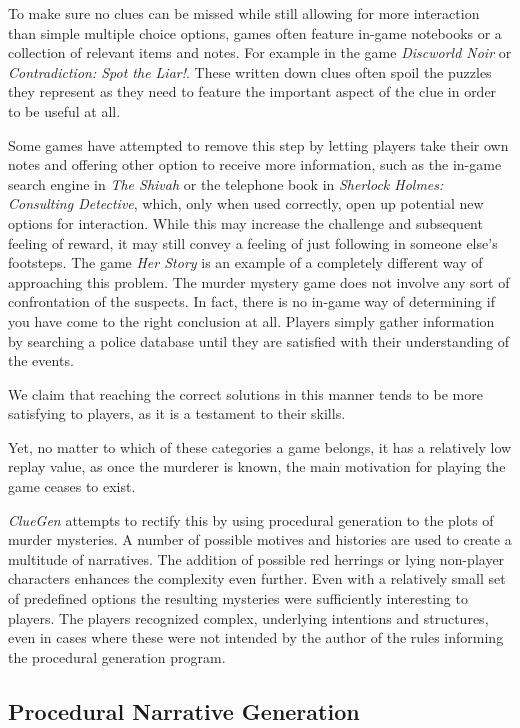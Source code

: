 To make sure no clues can be missed while still allowing for more interaction than simple multiple choice options, games often feature in-game notebooks or a collection of relevant items and notes.
For example in the game \emph{Discworld Noir} or \emph{Contradiction: Spot the Liar!}.
These written down clues often spoil the puzzles they represent as they need to feature the important aspect of the clue in order to be useful at all.

Some games have attempted to remove this step by letting players take their own notes and offering other option to receive more information, such as the in-game search engine in \emph{The Shivah} or the telephone book in \emph{Sherlock Holmes: Consulting Detective}, which, only when used correctly, open up potential new options for interaction.
While this may increase the challenge and subsequent feeling of reward, it may still convey a feeling of just following in someone else's footsteps.
The game \emph{Her Story} is an example of a completely different way of approaching this problem.
The murder mystery game does not involve any sort of confrontation of the suspects.
In fact, there is no in-game way of determining if you have come to the right conclusion at all.
Players simply gather information by searching a police database until they are satisfied with their understanding of the events.

We claim that reaching the correct solutions in this manner tends to be more satisfying to players, as it is a testament to their skills.

Yet, no matter to which of these categories a game belongs, it has a relatively low replay value, as once the murderer is known, the main motivation for playing the game ceases to exist.

\emph{ClueGen} \cite{stockdale_2016} attempts to rectify this by using procedural generation to the plots of murder mysteries.
A number of possible motives and histories are used to create a multitude of narratives.
The addition of possible red herrings or lying non-player characters enhances the complexity even further.
Even with a relatively small set of predefined options the resulting mysteries were sufficiently interesting to players.
The players recognized complex, underlying intentions and structures, even in cases where these were not intended by the author of the rules informing the procedural generation program.

\subsection{Procedural Narrative Generation}

